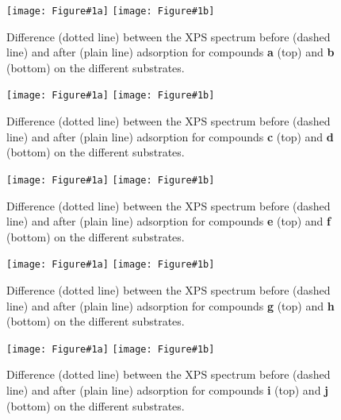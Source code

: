 \documentclass[journal=jpccck,manuscript=article]{achemso}
\begin{document}
\newcommand{\XPSsa}[3]{
\begin{figure}[!h]
	\centering
	\texttt{[image: Figure\#1a]}
	\texttt{[image: Figure\#1b]}
	\caption{Difference (dotted line) between the XPS spectrum before (dashed line) and after (plain line) adsorption for compounds \textbf{#2} (top) and \textbf{#3} (bottom) on the different substrates. }
	\label{fig:spectraXPSads#2#3}
\end{figure}
}

\XPSsa{S5}{a}{b}
\XPSsa{S6}{c}{d}
\XPSsa{S7}{e}{f}
\XPSsa{S8}{g}{h}
\XPSsa{S9}{i}{j}

\clearpage

	
\end{document}
